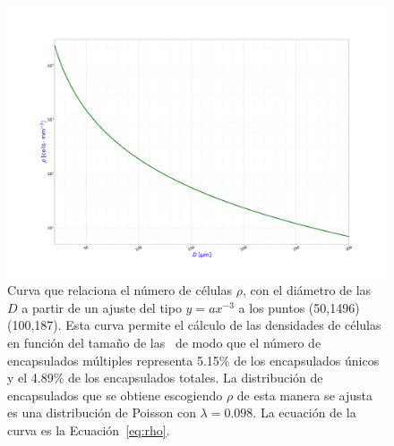 \begin{figure}[H]
    \begin{center}
        \includegraphics[width=\textwidth]{3_metodologia/curva_5_per_cent.png}
    \vspace{-15mm}
    \caption{\small Curva que relaciona el número de células $\rho$, con el diámetro de las \gotas\ $D$ a partir de un ajuste del tipo $y=ax^{-3}$ a los puntos (50,1496) (100,187). Esta curva permite el cálculo de las densidades de células en función del tamaño de las \gotas\ de modo que el número de encapsulados múltiples representa 5.15\% de los encapsulados únicos y el 4.89\% de los encapsulados totales. La distribución de encapsulados que se obtiene escogiendo $\rho$ de esta manera se ajusta es una distribución de Poisson con $\lambda=0.098$. La ecuación de la curva es la Ecuación~\ref{eq:rho}.}
    \label{fig:rho_d}
    \end{center}
\end{figure}




